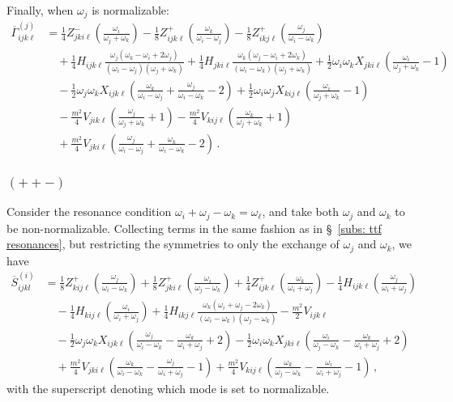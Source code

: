 \documentclass[letterpaper,11pt]{article}
\newcommand{\oi}{\omega_i}
\newcommand{\oj}{\omega_j}
\newcommand{\ok}{\omega_k}
\newcommand{\ol}{\omega_\ell}
\begin{document}
Finally, when $\oj$ is normalizable:
\begin{align}
\overline{\Gamma}^{(j)}_{ijk\ell} &= \frac{1}{4} Z^{-}_{jki\ell} \left(\frac{\oi}{\oj + \ok} \right) - \frac{1}{8} Z^{+}_{ijk\ell} \left( \frac{\ok}{\oi - \oj} \right) - \frac{1}{8} Z^{+}_{ikj\ell} \left( \frac{\oj}{\oi - \ok} \right) \nonumber \\
%
& \quad + \frac{1}{4} H_{ijk\ell} \frac{\oj (\ok - \oi + 2 \oj)}{(\oi - \oj)(\oj + \ok)} + \frac{1}{4} H_{jki\ell} \frac{\ok (\oj- \oi + 2\ok)}{(\oi - \ok)(\oj + \ok)} + \frac{1}{2} \oi \ok X_{jki\ell} \left( \frac{\oi}{\oj + \ok} - 1\right) \nonumber \\
%
& \quad - \frac{1}{2} \oj\ok X_{ijk\ell} \left( \frac{\ok}{\oi - \oj} + \frac{\oj}{\oi - \ok} - 2\right) + \frac{1}{2} \oi \oj X_{kij\ell} \left( \frac{\oi}{\oj + \ok} - 1 \right) \nonumber \\
%
& \quad - \frac{m^2}{4} V_{jik\ell} \left(\frac{\oj}{\oj + \ok} + 1 \right)  - \frac{m^2}{4} V_{kij\ell} \left( \frac{\ok}{\oj + \ok} + 1 \right) \nonumber \\
%
& \quad + \frac{m^2}{4} V_{jki\ell} \left( \frac{\oj}{\oi - \oj} + \frac{\ok}{\oi - \ok} - 2 \right) \, .
\end{align}

\subsubsection{$(++-)$}

Consider the resonance condition $\oi + \oj - \ok = \ol$, and take both $\oj$ and $\ok$ to be non-normalizable. Collecting terms in the same fashion as in \S\!~\ref{subs: ttf resonances}, but restricting the symmetries to only the exchange of $\omega_j$ and $\ok$, we have
\begin{align}
\overline{S}^{(i)}_{ijkl} &= \frac{1}{8} Z^+_{kij\ell} \left( \frac{\oj}{\oi - \ok} \right) + \frac{1}{8} Z^+_{jki\ell} \left( \frac{\oi}{\oj - \ok} \right) + \frac{1}{4} Z^+_{ijk\ell} \left( \frac{\ok}{\oi + \oj} \right) - \frac{1}{4} H_{ijk\ell} \left(\frac{\oj}{\oi + \oj} \right) \nonumber \\
%
& \quad  - \frac{1}{4} H_{kij\ell} \left( \frac{\oi}{\oi + \oj} \right) + \frac{1}{4} H_{ikj\ell} \frac{\ok ( \oi + \oj - 2\ok)}{(\oi - \ok)(\oj - \ok)} - \frac{m^2}{2} V_{ijk\ell} \nonumber \\
%
& \quad - \frac{1}{2} \oj \ok X_{ijk\ell} \left( \frac{\oj}{\oi - \ok} - \frac{\ok}{\oi + \oj} + 2 \right) - \frac{1}{2} \oi \ok X_{jki\ell} \left( \frac{\oi}{\oj - \ok} - \frac{\ok}{\oi + \oj} + 2 \right) \nonumber \\
%
& \quad + \frac{m^2}{4} V_{jki\ell} \left( \frac{\ok}{\oi - \ok} - \frac{\oj}{\oi + \oj} - 1 \right) + \frac{m^2}{4} V_{kij\ell} \left( \frac{\ok}{\oj - \ok} - \frac{\oi}{\oi + \oj} - 1 \right) \, ,
\end{align}
with the superscript denoting which mode is set to normalizable.
\end{document}

